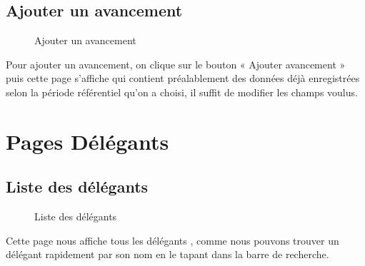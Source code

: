 \documentclass[a4paper]{report}
\begin{document}
\begin{doublespace}
	\subsection{Ajouter un avancement}
	\begin{figure}[H]
		\begin{center}
			\caption{Ajouter un avancement}
		\end{center}
	\end{figure}
	Pour ajouter un avancement, on clique sur le bouton « Ajouter avancement » puis cette page s'affiche qui contient préalablement des données déjà enregistrées selon la période référentiel qu'on a choisi, il suffit de modifier les champs voulus.
	\section{Pages Délégants}
	\subsection{Liste des délégants}
	\begin{figure}[H]
		\begin{center}
			\caption{Liste des délégants}
		\end{center}
	\end{figure}
	Cette page nous affiche tous les délégants , comme nous pouvons trouver un délégant rapidement par son nom en le tapant dans la barre de recherche.

\end{doublespace}
\end{document}
